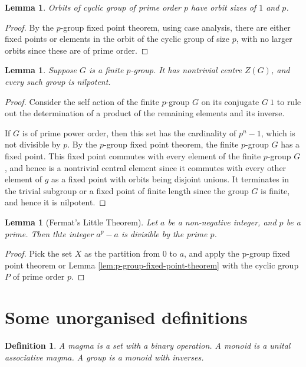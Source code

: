 \documentclass{tufte-book}
\newtheorem{definition}[theorem]{Definition}
\newtheorem{lemma}[theorem]{Lemma}
\begin{document}
\begin{lemma}
  Orbits of cyclic group of prime order $p$ have orbit sizes of $1$ and $p$.
\end{lemma}

\begin{proof}
  By the $p$-group fixed point theorem, using case analysis, there are either fixed points or elements in the orbit of the cyclic group of size $p$, with no larger orbits since these are of prime order.
\end{proof}

\begin{lemma}
  Suppose $G$ is a finite $p$-group. It has nontrivial centre $Z(G)$, and every such group is nilpotent.
\end{lemma}

\begin{proof}
  Consider the self action of the finite $p$-group $G$ on its conjugate $G \ {1}$ to rule out the determination of a product of the remaining elements and its inverse.

  If $G$ is of prime power order, then this set has the cardinality of $p^n - 1$, which is not divisible by $p$. By the $p$-group fixed point theorem, the finite $p$-group $G$ has a fixed point. This fixed point commutes with every element of the finite $p$-group $G$, and hence is a nontrivial central element since it commutes with every other element of $g$ as a fixed point with orbits being disjoint unions. It terminates in the trivial subgroup or a fixed point of finite length since the group $G$ is finite, and hence it is nilpotent.
\end{proof}

\begin{lemma}[Fermat's Little Theorem]
  Let $a$ be a non-negative integer, and $p$ be a prime.
  Then thte integer $a^p - a$ is divisible by the prime $p$. 
\end{lemma}

\begin{proof}
  Pick the set $X$ as the partition from $0$ to $a$, and apply the p-group fixed point theorem or Lemma \ref{lem:p-group-fixed-point-theorem} with the cyclic group $P$ of prime order $p$.
\end{proof}

\section{Some unorganised definitions}

\begin{definition}
  A magma is a set with a binary operation.
  A monoid is a unital associative magma.
  A group is a monoid with inverses.
\end{definition}
\end{document}
